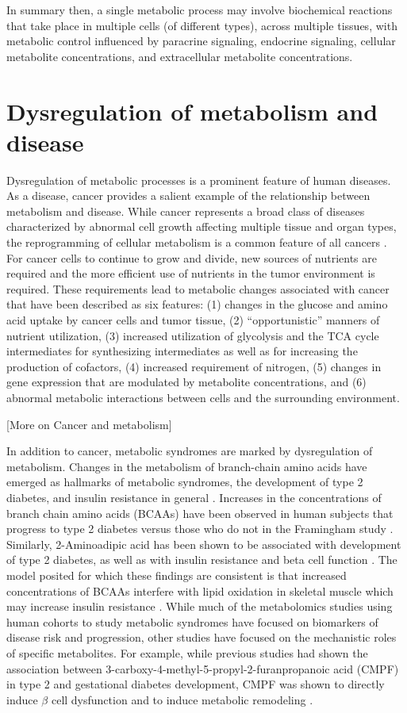 \begin{DoubleSpace*}
In summary then, a single metabolic process may involve biochemical reactions that take place in multiple cells (of different types), across multiple tissues, with metabolic control influenced by paracrine signaling, endocrine signaling, cellular metabolite concentrations, and extracellular metabolite concentrations.

\section{Dysregulation of metabolism and disease}
Dysregulation of metabolic processes is a prominent feature of human diseases. As a disease, cancer provides a salient example of the relationship between metabolism and disease. While cancer represents a broad class of diseases characterized by abnormal cell growth affecting multiple tissue and organ types, the reprogramming of cellular metabolism is a common feature of all cancers \cite{pavlova2016}. For cancer cells to continue to grow and divide, new sources of nutrients are required and the more efficient use of nutrients in the tumor environment is required. These requirements lead to metabolic changes associated with cancer that have been described \cite{pavlova2016} as six features: (1) changes in the glucose and amino acid uptake by cancer cells and tumor tissue, (2) ``opportunistic'' manners of nutrient utilization, (3) increased utilization of glycolysis and the TCA cycle intermediates for synthesizing intermediates as well as for increasing the production of cofactors, (4) increased requirement of nitrogen, (5) changes in gene expression that are modulated by metabolite concentrations, and (6) abnormal metabolic interactions between cells and the surrounding environment. 

[More on Cancer and metabolism] 

In addition to cancer, metabolic syndromes are marked by dysregulation of metabolism. Changes in the metabolism of branch-chain amino acids have emerged as hallmarks of metabolic syndromes, the development of type 2 diabetes, and insulin resistance in general \cite{newgard2017}. Increases in the concentrations of branch chain amino acids (BCAAs) have been observed in human subjects that progress to type 2 diabetes versus those who do not in the Framingham study \cite{wang2011}. Similarly, 2-Aminoadipic acid has been shown to be associated with development of type 2 diabetes, as well as with insulin resistance and beta cell function \cite{wang2013}. The model posited for which these findings are consistent is that increased concentrations of BCAAs interfere with lipid oxidation in skeletal muscle which may increase insulin resistance \cite{newgard2017}. While much of the metabolomics studies using human cohorts to study metabolic syndromes have focused on biomarkers of disease risk and progression, other studies have focused on the mechanistic roles of specific metabolites. For example, while previous studies had shown the association between  3-carboxy-4-methyl-5-propyl-2-furanpropanoic acid (CMPF) in type 2 and gestational diabetes development, CMPF was shown to directly induce $\beta$ cell dysfunction \cite{prentice2014} and to induce metabolic remodeling \cite{liu2016}.


\end{DoubleSpace*}
